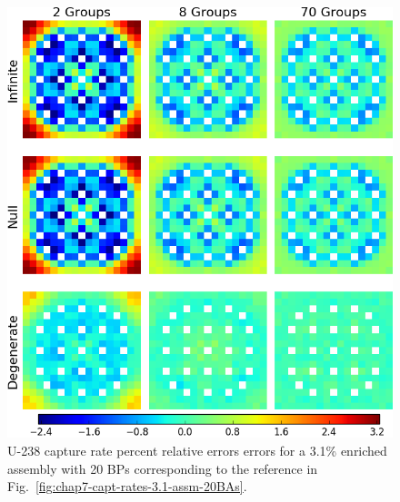 \begin{appendices}
\begin{figure}[h!]
\centering
\includegraphics[width=\linewidth]{figures/quantification/appendix/assm-31-20BPs/capt-err}
\vspace{2mm}
\caption[U-238 capture rate errors for a 3.1\% enriched assembly with 20 BPs]{U-238 capture rate percent relative errors errors for a 3.1\% enriched assembly with 20 \acp{BP} corresponding to the reference in Fig.~\ref{fig:chap7-capt-rates-3.1-assm-20BAs}.}
\label{fig:quantify-assm-3.1-20BPs-capt-err}
\end{figure}

\clearpage


\end{appendices}
